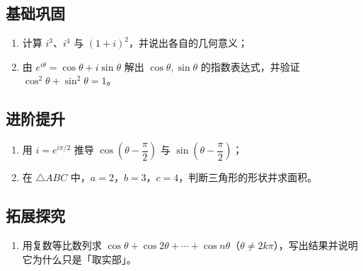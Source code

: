 \begin{afterclass}
\subsection*{基础巩固}
\begin{enumerate}
  \item 计算 $i^3$、$i^4$ 与 $(1+i)^2$，并说出各自的几何意义；
  \item 由 $e^{i\theta}=\cos\theta+i\sin\theta$ 解出 $\cos\theta,\sin\theta$ 的指数表达式，并验证 $\cos^2\theta+\sin^2\theta=1$。
\end{enumerate}

\subsection*{进阶提升}
\begin{enumerate}
  \item 用 $i=e^{i\pi/2}$ 推导 $\cos\left(\theta-\dfrac{\pi}{2}\right)$ 与 $\sin\left(\theta-\dfrac{\pi}{2}\right)$；
  \item 在 $\triangle ABC$ 中，$a=2$，$b=3$，$c=4$，判断三角形的形状并求面积。
\end{enumerate}

\subsection*{拓展探究}
\begin{enumerate}
  \item 用复数等比数列求 $\cos\theta+\cos2\theta+\cdots+\cos n\theta$（$\theta\neq2k\pi$），写出结果并说明它为什么只是「取实部」。
\end{enumerate}


\end{afterclass}
